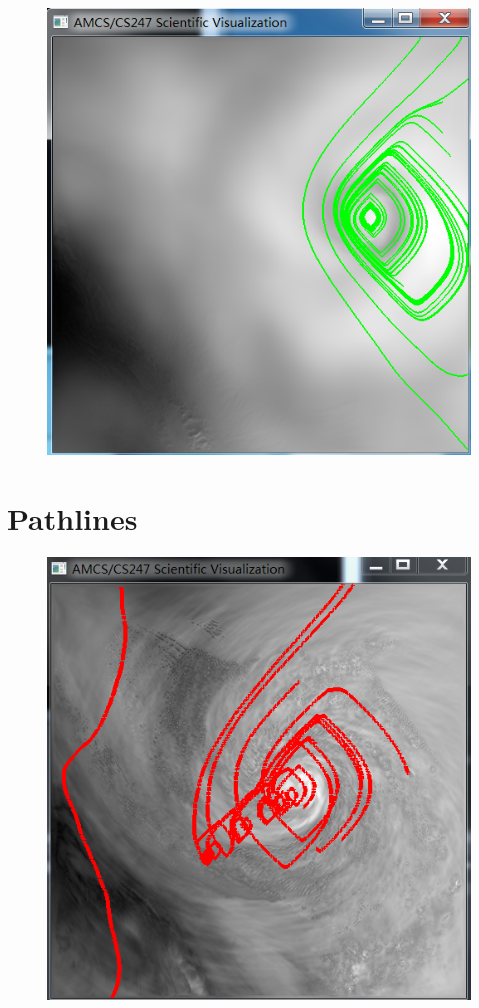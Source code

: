 \documentclass[12pt,letterpaper,fleqn]{article}          %
\begin{document}
\begin{figure}[!htb]
\centering
\includegraphics[scale=0.70]{3}
\end{figure}

\section{Pathlines}
\begin{figure}[!htb]
\centering
\includegraphics[scale=0.70]{5}
\end{figure}
\end{document}
